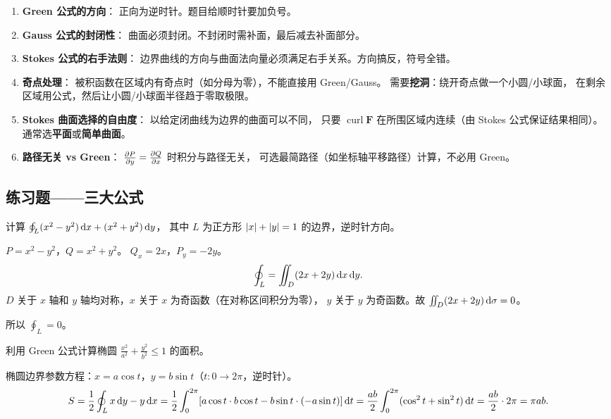 \documentclass{article}
\DeclareMathOperator{\curl}{curl}
\begin{document}
\begin{enumerate}
  \item \textbf{Green 公式的方向}：
    正向为逆时针。题目给顺时针要加负号。
  \item \textbf{Gauss 公式的封闭性}：
    曲面必须封闭。不封闭时需补面，最后减去补面部分。
  \item \textbf{Stokes 公式的右手法则}：
    边界曲线的方向与曲面法向量必须满足右手关系。方向搞反，符号全错。
  \item \textbf{奇点处理}：
    被积函数在区域内有奇点时（如分母为零），不能直接用 Green/Gauss。
    需要\textbf{挖洞}：绕开奇点做一个小圆/小球面，
    在剩余区域用公式，然后让小圆/小球面半径趋于零取极限。
  \item \textbf{Stokes 曲面选择的自由度}：
    以给定闭曲线为边界的曲面可以不同，
    只要 $\curl\mathbf{F}$ 在所围区域内连续（由 Stokes 公式保证结果相同）。
    通常选\textbf{平面}或\textbf{简单曲面}。
  \item \textbf{路径无关 vs Green}：
    $\frac{\partial P}{\partial y}=\frac{\partial Q}{\partial x}$ 时积分与路径无关，
    可选最简路径（如坐标轴平移路径）计算，不必用 Green。
\end{enumerate}

\subsection{练习题——三大公式}

\begin{exercise}
  计算 $\oint_L (x^2 - y^2) \,\mathrm{d} x + (x^2 + y^2) \,\mathrm{d} y$，
  其中 $L$ 为正方形 $\left| x \right|+\left| y \right|=1$ 的边界，逆时针方向。
\end{exercise}

\begin{solution}
  $P = x^2 - y^2$，$Q = x^2 + y^2$。
  $Q_x = 2x$，$P_y = -2y$。
  \[
    \oint_L = \iint_D (2x + 2y) \,\mathrm{d} x\,\mathrm{d} y.
  \]
  $D$ 关于 $x$ 轴和 $y$ 轴均对称，$x$ 关于 $x$ 为奇函数（在对称区间积分为零），
  $y$ 关于 $y$ 为奇函数。故 $\iint_D (2x+2y)\,\mathrm{d}\sigma = 0$。

  所以 $\oint_L = 0$。
\end{solution}

\begin{exercise}
  利用 Green 公式计算椭圆 $\frac{x^2}{a^2}+\frac{y^2}{b^2} \le 1$ 的面积。
\end{exercise}

\begin{solution}
  椭圆边界参数方程：$x = a\cos t$，$y = b\sin t$（$t: 0 \to 2\pi$，逆时针）。
  \[
    S = \frac{1}{2}\oint_L x\,\mathrm{d} y - y\,\mathrm{d} x
    = \frac{1}{2}\int_0^{2\pi} [a\cos t \cdot b\cos t - b\sin t \cdot
    (-a\sin t)] \,\mathrm{d} t
    = \frac{ab}{2}\int_0^{2\pi} (\cos^2 t + \sin^2 t) \,\mathrm{d} t
    = \frac{ab}{2} \cdot 2\pi = \pi ab.
  \]
\end{solution}
\end{document}
